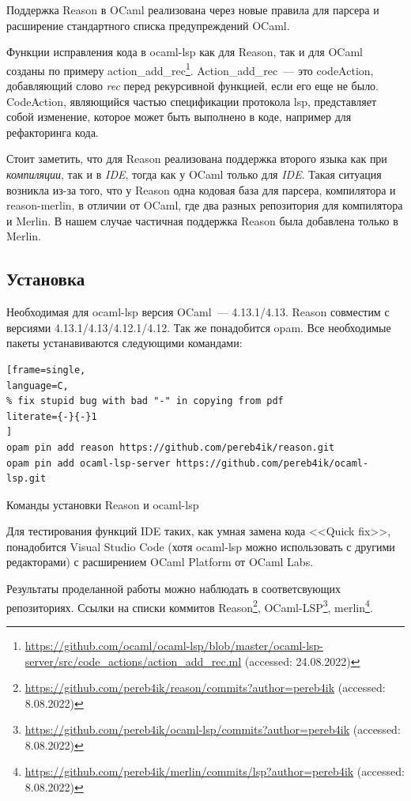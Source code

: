 Поддержка Reason в OCaml реализована через новые правила для парсера и расширение стандартного списка предупреждений OCaml.

Функции исправления кода в ocaml-lsp как для Reason, так и для OCaml созданы по примеру action\_add\_rec\footnote{ \url{https://github.com/ocaml/ocaml-lsp/blob/master/ocaml-lsp-server/src/code_actions/action_add_rec.ml} (accessed: 24.08.2022) }. Action\_add\_rec~--- это code\-Action, добавляющий слово {\it rec} перед рекурсивной функцией, если его еще не было. CodeAction, являющийся частью спецификации протокола lsp, представляет собой изменение, которое может быть выполнено в коде, например для рефакторинга кода.

Стоит заметить, что для Reason реализована поддержка второго языка как при {\it компиляции}, так и в {\it IDE}, тогда как у OCaml только для {\it IDE}. Такая ситуация возникла из-за того, что у Reason одна кодовая база для парсера, компилятора и reason-merlin, в отличии от OCaml, где два разных репозитория для компилятора и Merlin. В нашем случае частичная поддержка Reason была добавлена только в Merlin.

\subsection{Установка}
Необходимая для ocaml-lsp версия OCaml~--- 4.13.1/4.13. Reason совместим с версиями 4.13.1/4.13/4.12.1/4.12. Так же понадобится opam. Все необходимые пакеты устанавиваются следующими командами:

\lstset{basicstyle=\ttfamily}
\begin{example}
\begin{lstlisting}[frame=single,
language=C,
% fix stupid bug with bad "-" in copying from pdf
literate={-}{-}1
]
opam pin add reason https://github.com/pereb4ik/reason.git
opam pin add ocaml-lsp-server https://github.com/pereb4ik/ocaml-lsp.git
\end{lstlisting}
\caption{Команды установки Reason и ocaml-lsp}
\end{example}
Для тестирования функций IDE таких, как умная замена кода <<Quick fix>>, понадобится Visual Studio Code (хотя ocaml-lsp можно использовать с другими редакторами) с расширением OCaml Platform от OCaml Labs.

Результаты проделанной работы можно наблюдать в соответсвующих репозиториях. Ссылки на списки коммитов Reason\footnote{ \url{https://github.com/pereb4ik/reason/commits?author=pereb4ik} (accessed: 8.08.2022) },
OCaml-LSP\footnote{ \url{https://github.com/pereb4ik/ocaml-lsp/commits?author=pereb4ik} (accessed: 8.08.2022) },
merlin\footnote{ \url{https://github.com/pereb4ik/merlin/commits/lsp?author=pereb4ik} (accessed: 8.08.2022) }.